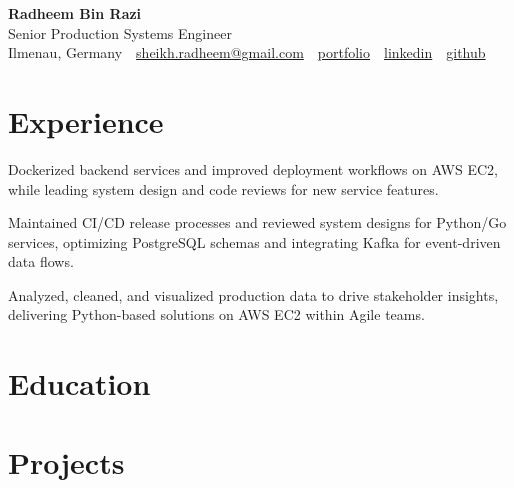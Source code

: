 \documentclass[11pt,a4paper]{resume}
\makeatletter
\newcommand{\Portfolio}{https://radheem.github.io/my-cv}
\newcommand{\PortfolioText}{portfolio}
\newcommand{\GitHub}{https://github.com/radheem}
\newcommand{\LinkedIn}{https://www.linkedin.com/in/radheem-razi}
\newcommand{\Email}{sheikh.radheem@gmail.com}
\makeatother
\begin{document}
\begin{center}
  {\huge\bfseries Radheem Bin Razi}\\[3pt]
  {\large Senior Production Systems Engineer}\\[6pt]
  \small
  Ilmenau, Germany \,\textbar\,
  \href{mailto:\Email}{\Email} \,\textbar\,
  \href{\Portfolio}{\PortfolioText} \,\textbar\,
  \href{\LinkedIn}{linkedin} \,\textbar\,
  \href{\GitHub}{github}
\end{center}
\vspace{2pt}

\section{Experience}

\bullets
  \item Dockerized backend services and improved deployment workflows on AWS EC2, while leading system design and code reviews for new service features.
\bulletsend
\vspace{3pt}
\bullets
  \item Maintained CI/CD release processes and reviewed system designs for Python/Go services, optimizing PostgreSQL schemas and integrating Kafka for event-driven data flows.
\bulletsend
\vspace{3pt}
\bullets
  \item Analyzed, cleaned, and visualized production data to drive stakeholder insights, delivering Python-based solutions on AWS EC2 within Agile teams.
\bulletsend
\vspace{3pt}

\section{Education}

\vspace{2pt}

\section{Projects}
\end{document}
